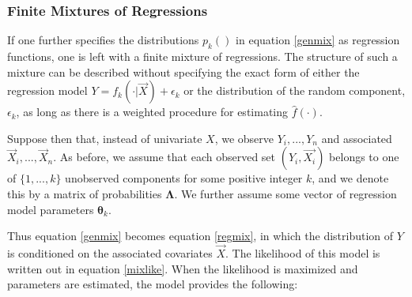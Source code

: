 \documentclass[10pt]{olplainarticle}\usepackage[]{graphicx}\usepackage[]{color}
\begin{document}

% 

\subsubsection{Finite Mixtures of Regressions} \label{fmrs}

If one further specifies the distributions $p_k()$ in equation \ref{genmix} as regression functions, one is left with a finite mixture of regressions. The structure of such a mixture can be described without specifying the exact form of either the regression model $Y = f_k(\cdot|\vec{X}) + \epsilon_k$ or the distribution of the random component, $\epsilon_k$, as long as there is a weighted procedure for estimating $\hat{f}(\cdot)$. 

Suppose then that, instead of univariate $X$, we observe $Y_i,...,Y_n$ and associated $\vec{X}_i,...,\vec{X}_n$. As before, we assume that each observed set $(Y_i, \vec{X_i})$ belongs to one of $\{1,...,k\}$ unobserved components for some positive integer $k$, and we denote this by a matrix of probabilities $\boldsymbol{\Lambda}$. We further assume some vector of regression model parameters $\boldsymbol{\theta}_k$. 





Thus equation \ref{genmix} becomes equation \ref{regmix}, in which the distribution of $Y$ is conditioned on the associated covariates $\vec{X}$. The likelihood of this model is written out in equation \ref{mixlike}. When the likelihood is maximized and parameters are estimated, the model provides the following:
\end{document}
